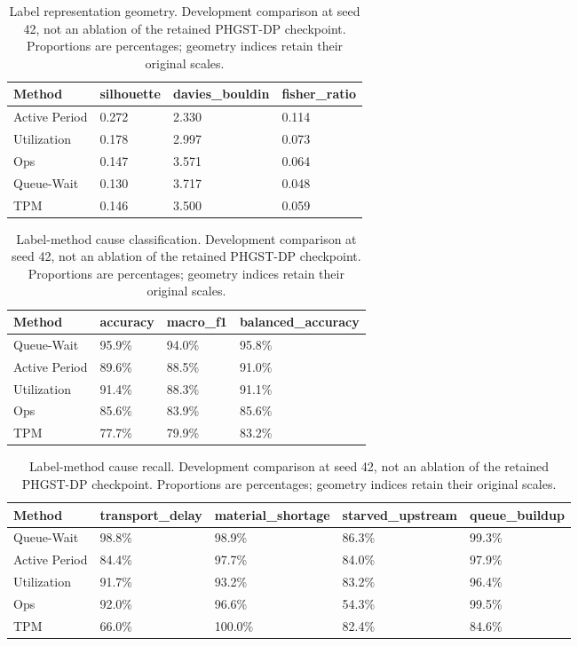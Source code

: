 \begin{table}[p]
\centering\scriptsize
\caption{Label representation geometry. Development comparison at seed 42, not an ablation of the retained PHGST-DP checkpoint. Proportions are percentages; geometry indices retain their original scales.}
\begin{tabularx}{\textwidth}{lXXX}
\toprule
Method & silhouette & davies\_bouldin & fisher\_ratio \\
\midrule
Active Period & 0.272 & 2.330 & 0.114 \\
Utilization & 0.178 & 2.997 & 0.073 \\
Ops & 0.147 & 3.571 & 0.064 \\
Queue-Wait & 0.130 & 3.717 & 0.048 \\
TPM & 0.146 & 3.500 & 0.059 \\
\bottomrule
\end{tabularx}
\end{table}

\begin{table}[p]
\centering\scriptsize
\caption{Label-method cause classification. Development comparison at seed 42, not an ablation of the retained PHGST-DP checkpoint. Proportions are percentages; geometry indices retain their original scales.}
\begin{tabularx}{\textwidth}{lXXX}
\toprule
Method & accuracy & macro\_f1 & balanced\_accuracy \\
\midrule
Queue-Wait & 95.9\% & 94.0\% & 95.8\% \\
Active Period & 89.6\% & 88.5\% & 91.0\% \\
Utilization & 91.4\% & 88.3\% & 91.1\% \\
Ops & 85.6\% & 83.9\% & 85.6\% \\
TPM & 77.7\% & 79.9\% & 83.2\% \\
\bottomrule
\end{tabularx}
\end{table}

\begin{table}[p]
\centering\scriptsize
\caption{Label-method cause recall. Development comparison at seed 42, not an ablation of the retained PHGST-DP checkpoint. Proportions are percentages; geometry indices retain their original scales.}
\begin{tabularx}{\textwidth}{lXXXX}
\toprule
Method & transport\_delay & material\_shortage & starved\_upstream & queue\_buildup \\
\midrule
Queue-Wait & 98.8\% & 98.9\% & 86.3\% & 99.3\% \\
Active Period & 84.4\% & 97.7\% & 84.0\% & 97.9\% \\
Utilization & 91.7\% & 93.2\% & 83.2\% & 96.4\% \\
Ops & 92.0\% & 96.6\% & 54.3\% & 99.5\% \\
TPM & 66.0\% & 100.0\% & 82.4\% & 84.6\% \\
\bottomrule
\end{tabularx}
\end{table}

